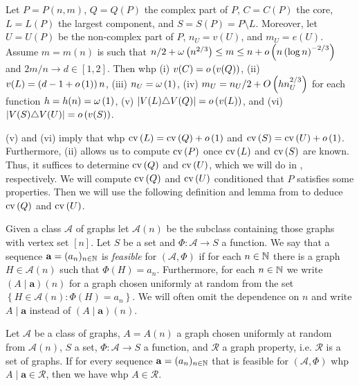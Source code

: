 \begin{thm}\label{thm:internal_structure}
Let $P=P(n,m)$, $Q=Q(P)$ the complex part of $P$, $C=C(P)$ the core, $L=L(P)$ the largest component, and $S=S(P)=P\setminus L$. Moreover, let $U=U(P)$ be the non-complex part of $P$, $n_U=v(U)$, and $m_U=e(U)$. Assume $m=m(n)$ is such that $n/2+\omega\left(n^{2/3}\right)\leq m \leq n+o\left(n\left(\log n\right)^{-2/3}\right)$ and $2m/n \to d\in[1,2]$. Then whp \textup{(i)} $v(C)=o\left(v(Q)\right)$, \textup{(ii)} $v(L)=\left(d-1+o\left(1\right)\right)n$, \textup{(iii)} $n_U=\omega\left(1\right)$, \textup{(iv)} $m_U= n_U/2+O\left(hn_U^{2/3}\right)$ for each function $h=h(n)=\omega\left(1\right)$, \textup{(v)} $\left|V(L)\triangle V(Q)\right|=o\left(v(L)\right)$, and \textup{(vi)} $\left|V(S)\triangle V(U)\right|=o\left(v(S)\right)$.
\end{thm}
(v) and (vi) imply that whp $\operatorname{cv}\left(L\right)=\operatorname{cv}\left(Q\right)+o\left(1\right)$ and $\operatorname{cv}\left(S\right)=\operatorname{cv}\left(U\right)+o\left(1\right)$. Furthermore, (ii) allows us to compute $\operatorname{cv}\left(P\right)$ once $\operatorname{cv}\left(L\right)$ and $\operatorname{cv}\left(S\right)$ are known. Thus, it suffices to determine $\operatorname{cv}\left(Q\right)$ and $\operatorname{cv}\left(U\right)$, which we will do in , respectively. We will compute $\operatorname{cv}\left(Q\right)$ and $\operatorname{cv}\left(U\right)$ conditioned that $P$ satisfies some properties. Then we will use the following definition and lemma from \cite{KangMissethan2021} to deduce $\operatorname{cv}\left(Q\right)$ and $\operatorname{cv}\left(U\right)$.
	
\begin{definition}\label{def:feasible} 
Given a class $\mathcal{A}$ of graphs let $\mathcal{A}(n)$ be the subclass containing those graphs with vertex set $[n]$.
Let $S$ be a set  and $\Phi:\mathcal{A}\to S$ a function. We say that a sequence $\mathbf{a}=(a_n)_{n\in \mathbb{N}}$ is {\em feasible} for $\left(\mathcal{A}, \Phi\right)$ if for each $n \in \mathbb{N}$  there is a graph $H \in \mathcal{A}(n)$ such that $\Phi(H)=a_n$. Furthermore, for each $n\in \mathbb{N}$ we write $\left(A\mid\mathbf{a}\right)(n)$ for a graph chosen uniformly at random from the set $\left\{H \in \mathcal{A}(n): \Phi(H)=a_n\right\}$. We will often omit the dependence on $n$ and write $A\mid\mathbf{a}$ instead of $\left(A\mid\mathbf{a}\right)(n)$.
\end{definition}
\begin{lem}\label{lem:conditional_random_graphs}
Let $\mathcal{A}$ be a class of graphs, $A=A(n)$ a graph chosen uniformly at random from $\mathcal{A}(n)$, $S$ a set, $\Phi:\mathcal{A}\to S$ a function, and $\mathcal{R}$ a graph property, i.e. $\mathcal{R}$ is a set of graphs. If for every sequence $\mathbf{a}=(a_n)_{n\in \mathbb{N}}$ that is feasible for $\left(\mathcal{A}, \Phi\right)$ whp $A\mid\mathbf{a}\in \mathcal{R}$, then we have whp $A \in \mathcal{R}$.
\end{lem}
	
